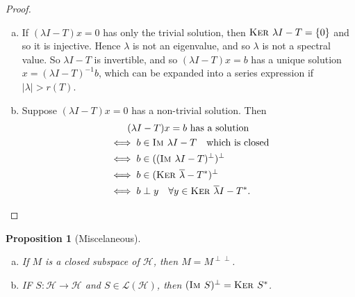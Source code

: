 \documentclass[10pt, oneside, reqno]{amsbook}
\theoremstyle{plain}%
\newtheorem{prop}[thm]{Proposition}
\theoremstyle{definition}
\theoremstyle{remark}
\newcommand{\im}{\textsc{Im\ }}
\renewcommand{\ker}{\textsc{Ker\ }}
\begin{document}
\begin{proof}
    {\ } \begin{enumerate}[(a)]
        \item If $(\lambda I - T) x = 0$ has only the trivial solution, then $\ker \lambda I - T = \{ 0 \}$ and so it is injective.  Hence $\lambda$ is not an eigenvalue, and so $\lambda$ is not a spectral value.  So $\lambda I - T$ is invertible, and so $(\lambda I - T) x = b$ has a unique solution $x = (\lambda I - T)^{-1} b$, which can be expanded into a series expression if $|\lambda| > r(T)$.  
        \item Suppose $(\lambda I - T) x = 0$ has a non-trivial solution.  Then
        \begin{align*}
            &\qquad\text{$(\lambda I - T) x = b$ has a solution} \\
            &\iff b \in \im \lambda I - T \quad \text{which is closed} \\
            &\iff b \in ((\im \lambda I - T)^\perp)^\perp \\
            &\iff b \in (\ker \overline \lambda - T^*)^\perp \\
            &\iff b \perp y \quad \forall y \in \ker \overline \lambda I - T^*.\qedhere
        \end{align*}
    \end{enumerate}
\end{proof}

\begin{prop}[Miscelaneous]{\ }\begin{enumerate}[(a)]
    \item If $M$ is a closed subspace of $\mathcal H$, then $M = M^{\perp \perp}$. 
    \item IF $S: \mathcal H \rightarrow \mathcal H$ and $S \in \mathcal L(\mathcal H)$, then $(\im S)^\perp = \ker S^*$.  
\end{enumerate}
\end{prop}
\end{document}
